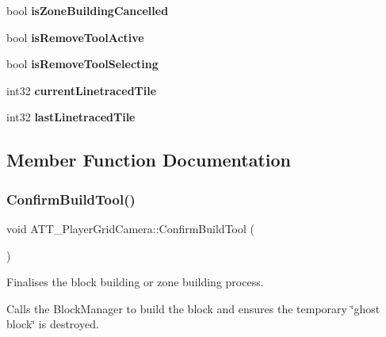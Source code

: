 \begin{DoxyCompactItemize}
bool {\bfseries is\+Zone\+Building\+Cancelled}
\item 
\mbox{\label{class_a_t_t___player_grid_camera_a43fdd2474160af3f781cce0dcf89698a}} 
bool {\bfseries is\+Remove\+Tool\+Active}
\item 
\mbox{\label{class_a_t_t___player_grid_camera_a879aec854adb763eee6b92ab6fc07665}} 
bool {\bfseries is\+Remove\+Tool\+Selecting}
\item 
\mbox{\label{class_a_t_t___player_grid_camera_a8105870a2afcb2dd19b75ff3d440cfeb}} 
int32 {\bfseries current\+Linetraced\+Tile}
\item 
\mbox{\label{class_a_t_t___player_grid_camera_ae9c569efb9b6529fcbfeec91f9a70ec6}} 
int32 {\bfseries last\+Linetraced\+Tile}
\end{DoxyCompactItemize}


\subsection{Member Function Documentation}
\mbox{\label{class_a_t_t___player_grid_camera_aca622600a2b7f3a52b001c34a0da537b}} 
\subsubsection{\texorpdfstring{ConfirmBuildTool()}{ConfirmBuildTool()}}
{\footnotesize\ttfamily void A\+T\+T\+\_\+\+Player\+Grid\+Camera\+::\+Confirm\+Build\+Tool (\begin{DoxyParamCaption}{ }\end{DoxyParamCaption})\hspace{0.3cm}{\ttfamily [protected]}}



Finalises the block building or zone building process. 

Calls the Block\+Manager to build the block and ensures the temporary \char`\"{}ghost block\char`\"{} is destroyed. \mbox{\label{class_a_t_t___player_grid_camera_a8fd9c9e736603f9b0bf9768b2e8ac898}} 
